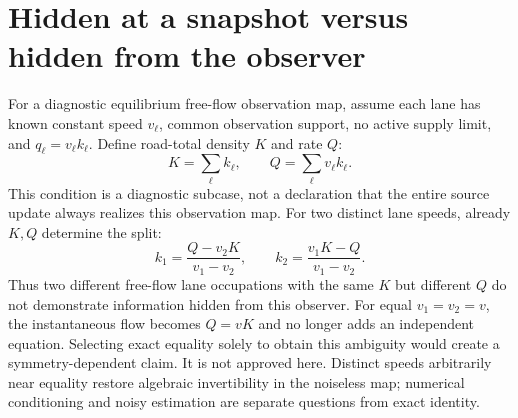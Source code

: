\documentclass[10pt,a4paper]{article}
\begin{document}
\section{Hidden at a snapshot versus hidden from the observer}
For a diagnostic equilibrium free-flow observation map, assume each lane has
known constant speed $v_\ell$, common observation support, no active supply
limit, and $q_\ell=v_\ell k_\ell$. Define road-total density $K$ and rate $Q$:
\begin{equation}
 K=\sum_\ell k_\ell,\qquad Q=\sum_\ell v_\ell k_\ell. \label{eq:moments}
\end{equation}
This condition is a diagnostic subcase, not a declaration that the entire
source update always realizes this observation map.
For two distinct lane speeds, already $K,Q$ determine the split:
\begin{equation}
 k_1=\frac{Q-v_2K}{v_1-v_2},\qquad
 k_2=\frac{v_1K-Q}{v_1-v_2}. \label{eq:two}
\end{equation}
Thus two different free-flow lane occupations with the same $K$ but different
$Q$ do not demonstrate information hidden from this observer.
For equal $v_1=v_2=v$, the instantaneous flow becomes $Q=vK$ and no longer
adds an independent equation. Selecting exact equality solely to obtain this
ambiguity would create a symmetry-dependent claim. It is not approved here.
Distinct speeds arbitrarily near equality restore algebraic invertibility
in the noiseless map; numerical conditioning and noisy estimation are separate
questions from exact identity.
\end{document}
